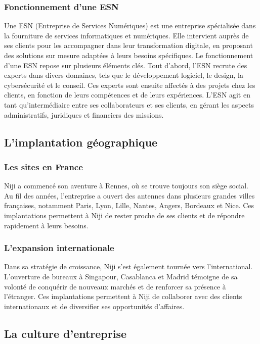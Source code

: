 \documentclass[12pt]{article}
\begin{document}
\subsubsection{Fonctionnement d'une ESN}
Une ESN (Entreprise de Services Numériques) est une entreprise spécialisée dans la fourniture de services informatiques et numériques. Elle intervient auprès de ses clients pour les accompagner dans leur transformation digitale, en proposant des solutions sur mesure adaptées à leurs besoins spécifiques. Le fonctionnement d'une ESN repose sur plusieurs éléments clés.
Tout d'abord, l'ESN recrute des experts dans divers domaines, tels que le développement logiciel, le design, la cybersécurité et le conseil. Ces experts sont ensuite affectés à des projets chez les clients, en fonction de leurs compétences et de leurs expériences. L'ESN agit en tant qu'intermédiaire entre ses collaborateurs et ses clients, en gérant les aspects administratifs, juridiques et financiers des missions.

\subsection{L'implantation géographique}
\subsubsection{Les sites en France}
Niji a commencé son aventure à Rennes, où se trouve toujours son siège social. Au fil des années, l'entreprise a ouvert des antennes dans plusieurs grandes villes françaises, notamment Paris, Lyon, Lille, Nantes, Angers, Bordeaux et Nice. Ces implantations permettent à Niji de rester proche de ses clients et de répondre rapidement à leurs besoins.

\subsubsection{L'expansion internationale}
Dans sa stratégie de croissance, Niji s'est également tournée vers l'international. L'ouverture de bureaux à Singapour, Casablanca et Madrid témoigne de sa volonté de conquérir de nouveaux marchés et de renforcer sa présence à l'étranger. Ces implantations permettent à Niji de collaborer avec des clients internationaux et de diversifier ses opportunités d'affaires.

\subsection{La culture d'entreprise}
\end{document}
